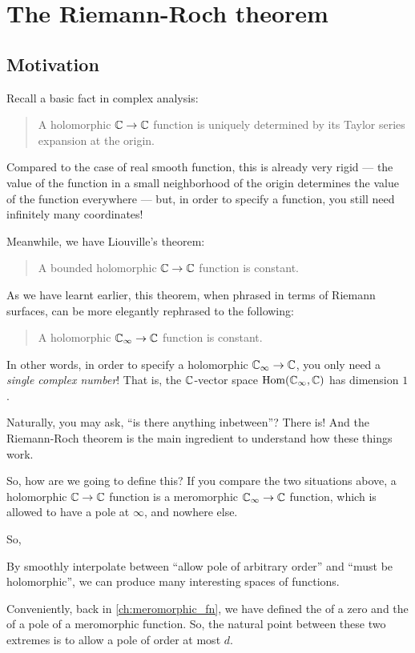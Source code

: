 \chapter{The Riemann-Roch theorem}

\section{Motivation}

Recall a basic fact in complex analysis:
\begin{quote}
	A holomorphic $\mathbb C \to \mathbb C$ function is uniquely determined by its Taylor series expansion at
	the origin.
\end{quote}

Compared to the case of real smooth function, this is already very rigid --- the value of the
function in a small neighborhood of the origin determines the value of the function everywhere ---
but, in order to specify a function, you still need infinitely many coordinates!

Meanwhile, we have Liouville's theorem:
\begin{quote}
	A bounded holomorphic $\mathbb C \to \mathbb C$ function is constant.
\end{quote}
As we have learnt earlier, this theorem, when phrased in terms of Riemann surfaces, can be more
elegantly rephrased to the following:
\begin{quote}
	A holomorphic $\mathbb C_\infty \to \mathbb C$ function is constant.
\end{quote}
In other words, in order to specify a holomorphic $\mathbb C_\infty \to \mathbb C$, you only need a \emph{single
complex number}! That is, the $\mathbb C$-vector space $\operatorname{Hom}(\mathbb C_\infty, \mathbb C)$ has dimension $1$.

Naturally, you may ask, ``is there anything inbetween''? There is! And the Riemann-Roch theorem is
the main ingredient to understand how these things work.

So, how are we going to define this? If you compare the two situations above,
a holomorphic $\mathbb C \to \mathbb C$ function is a meromorphic $\mathbb C_\infty \to \mathbb C$ function, which
is allowed to have a pole at $\infty$, and nowhere else.

So,
\begin{moral}
	By smoothly interpolate between ``allow pole of arbitrary order'' and ``must be holomorphic'',
	we can produce many interesting spaces of functions.
\end{moral}

Conveniently, back in \cref{ch:meromorphic_fn}, we have defined the  of a
zero and the  of a pole of a meromorphic function.
So, the natural point between these two extremes is to allow a pole of order at most $d$.

